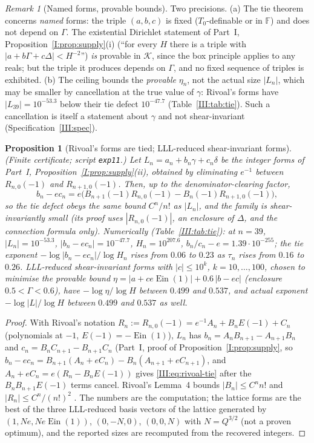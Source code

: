 \documentclass[11pt,a4paper]{article}
\newcommand{\Ein}{\operatorname{Ein}}
\newcommand{\Fld}{\mathbb F}
\newcommand{\Th}{\mathcal K}
\newcommand{\Tz}{T_0}
\newtheorem{proposition}[theorem]{Proposition}
\theoremstyle{definition}
\theoremstyle{remark}
\newtheorem{remark}[theorem]{Remark}
\numberwithin{equation}{section}
\begin{document}
\begin{remark}[Named forms, provable bounds]\label{III:rem:named}
Two precisions. (a) The tie theorem concerns \emph{named} forms: the triple $(a,b,c)$ is
fixed ($\Tz$-definable or in $\Fld$) and does not depend on $\Gamma$. The existential
Dirichlet statement of Part~I, Proposition~\ref{I:prop:supply}(i) (``for every $H$ there is a triple with
$|a+b\Gamma+c\Delta|<H^{-2}$'') \emph{is} provable in $\Th$, since the box principle
applies to any reals; but the triple it produces depends on $\Gamma$, and no fixed
sequence of triples is exhibited. (b) The ceiling bounds the \emph{provable} $\eta_n$,
not the actual size $|L_n|$, which may be smaller by cancellation at the true value of
$\gamma$: Rivoal's forms have $|L_{39}|=10^{-53.3}$ below their tie defect $10^{-47.7}$
(Table~\ref{III:tab:tie}). Such a cancellation is itself a statement about $\gamma$ and not
shear-invariant (Specification~\ref{III:spec}).
\end{remark}

\begin{proposition}[Rivoal's forms are tied; LLL-reduced shear-invariant forms]\label{III:prop:rivoal-tie}
\textup{(Finite certificate; script \texttt{exp11}.)} Let $L_n=a_n+b_n\gamma+c_n\delta$
be the integer forms of Part~I, Proposition~\ref{I:prop:supply}(ii), obtained by eliminating $e^{-1}$
between $R_{n,0}(-1)$ and $R_{n+1,0}(-1)$. Then, up to the denominator-clearing factor,
\begin{equation}\label{III:eq:rivoal-tie}
 b_n-ec_n=e\bigl(B_{n+1}(-1)R_{n,0}(-1)-B_n(-1)R_{n+1,0}(-1)\bigr),
\end{equation}
so the tie defect obeys the same bound $C^n/n!$ as $|L_n|$, and the family is
shear-invariantly small (its proof uses $|R_{n,0}(-1)|$, an enclosure of $\Delta$, and the
connection formula only). Numerically (Table~\ref{III:tab:tie}): at $n=39$,
$|L_n|=10^{-53.3}$, $|b_n-ec_n|=10^{-47.7}$, $H_n=10^{207.6}$, $b_n/c_n-e=1.39\cdot10^{-255}$;
the tie exponent $-\log|b_n-ec_n|/\log H_n$ rises from $0.06$ to $0.23$ as $\tau_n$ rises
from $0.16$ to $0.26$. LLL-reduced shear-invariant forms with $|c|\le10^k$,
$k=10,\dots,100$, chosen to minimise the provable bound
$\eta=|a+ce\Ein(1)|+0.6\,|b-ec|$ (enclosure $0.5<\Gamma<0.6$), have $-\log\eta/\log H$
between $0.499$ and $0.537$, and actual exponent $-\log|L|/\log H$ between $0.499$ and
$0.537$ as well.
\end{proposition}
\begin{proof}
With Rivoal's notation $R_n:=R_{n,0}(-1)=e^{-1}A_n+B_nE(-1)+C_n$ (polynomials at $-1$,
$E(-1)=-\Ein(1)$), $L_n$ has $b_n=A_nB_{n+1}-A_{n+1}B_n$ and $c_n=B_nC_{n+1}-B_{n+1}C_n$
(Part~I, proof of Proposition~\ref{I:prop:supply}, so
$b_n-ec_n=B_{n+1}(A_n+eC_n)-B_n(A_{n+1}+eC_{n+1})$, and $A_n+eC_n=e(R_n-B_nE(-1))$ gives
\eqref{III:eq:rivoal-tie} after the $B_nB_{n+1}E(-1)$ terms cancel. Rivoal's Lemma~4 bounds
$|B_n|\le C^nn!$ and $|R_n|\le C^n/(n!)^2$ \cite{Rivoal2012}. The numbers are the
computation; the lattice forms are the best of the three LLL-reduced basis vectors of the
lattice generated by $(1,Ne,Ne\Ein(1))$, $(0,-N,0)$, $(0,0,N)$ with $N=Q^{3/2}$ (not a
proven optimum), and the reported sizes are recomputed from the recovered integers.
\end{proof}
\end{document}
